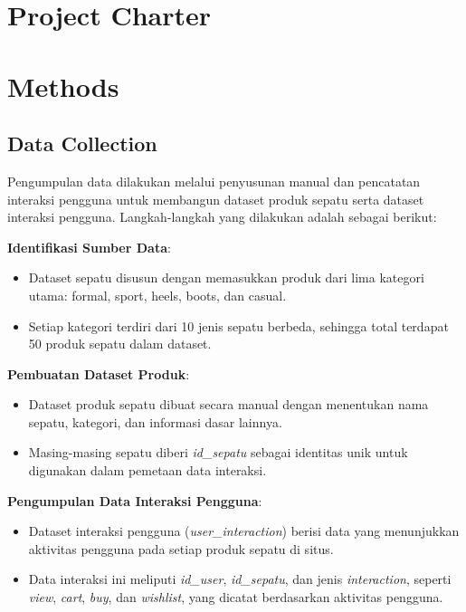 \documentclass[journal,article,submit,pdftex,moreauthors]{Definitions/mdpi}
\begin{document}

\section{Project Charter}

\section{Methods}
\subsection{Data Collection}

Pengumpulan data dilakukan melalui penyusunan manual dan pencatatan interaksi pengguna untuk membangun dataset produk sepatu serta dataset interaksi pengguna. Langkah-langkah yang dilakukan adalah sebagai berikut:


    \item \textbf{Identifikasi Sumber Data}:
    \begin{itemize}
        \item Dataset sepatu disusun dengan memasukkan produk dari lima kategori utama: formal, sport, heels, boots, dan casual.
        \item Setiap kategori terdiri dari 10 jenis sepatu berbeda, sehingga total terdapat 50 produk sepatu dalam dataset.
    \end{itemize}
    
    \item \textbf{Pembuatan Dataset Produk}:
    \begin{itemize}
        \item Dataset produk sepatu dibuat secara manual dengan menentukan nama sepatu, kategori, dan informasi dasar lainnya.
        \item Masing-masing sepatu diberi \textit{id\_sepatu} sebagai identitas unik untuk digunakan dalam pemetaan data interaksi.
    \end{itemize}
    
    \item \textbf{Pengumpulan Data Interaksi Pengguna}:
    \begin{itemize}
        \item Dataset interaksi pengguna (\textit{user\_interaction}) berisi data yang menunjukkan aktivitas pengguna pada setiap produk sepatu di situs.
        \item Data interaksi ini meliputi \textit{id\_user}, \textit{id\_sepatu}, dan jenis \textit{interaction}, seperti \textit{view}, \textit{cart}, \textit{buy}, dan \textit{wishlist}, yang dicatat berdasarkan aktivitas pengguna.
    \end{itemize}
    
\end{document}

